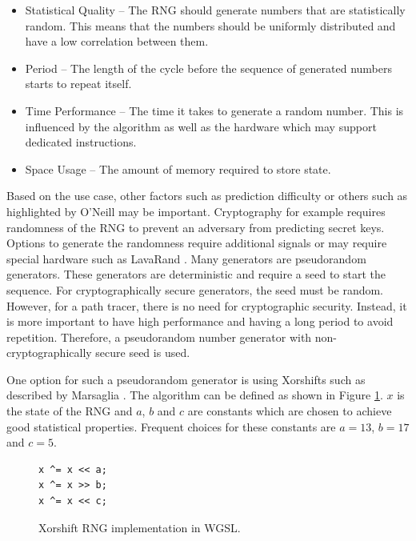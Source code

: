 \begin{itemize}
    \item{Statistical Quality} – The \gls{RNG} should generate numbers that are statistically random. This means that the numbers should be uniformly distributed and have a low correlation between them.
    \item{Period} – The length of the cycle before the sequence of generated numbers starts to repeat itself.
    \item{Time Performance} – The time it takes to generate a random number. This is influenced by the algorithm as well as the hardware which may support dedicated instructions.
    \item{Space Usage} – The amount of memory required to store state.
\end{itemize}

Based on the use case, other factors such as prediction difficulty or others such as highlighted by O’Neill \cite{o2014pcg} may be important. Cryptography for example requires randomness of the \gls{RNG} to prevent an adversary from predicting secret keys. Options to generate the randomness require additional signals \cite{randomnessCryptography} or may require special hardware such as LavaRand \cite{cloudflareLavaRand}. Many generators are pseudorandom generators. These generators are deterministic and require a seed to start the sequence. For cryptographically secure generators, the seed must be random.
However, for a path tracer, there is no need for cryptographic security. Instead, it is more important to have high performance and having a long period to avoid repetition. Therefore, a pseudorandom number generator with non-cryptographically secure seed is used.

One option for such a pseudorandom generator is using Xorshifts such as described by Marsaglia \cite{marsaglia2003xorshift}. The algorithm can be defined as shown in Figure \ref{code:xorShift}. $x$ is the state of the \gls{RNG} and $a$, $b$ and $c$ are constants which are chosen to achieve good statistical properties. Frequent choices for these constants are $a = 13$, $b = 17$ and $c = 5$.

\begin{figure}[H]
\begin{lstlisting}[style=wgsl]
x ^= x << a;
x ^= x >> b;
x ^= x << c;
\end{lstlisting}
\caption{Xorshift \gls{RNG} implementation in \gls{WGSL}.}
\label{code:xorShift}
\end{figure}

